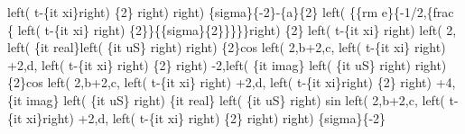 \begin{maplegroup}
left( t-\{it xi\}right) \{2\} right)  right) \{sigma\}\{-2\}-\{a\}\{2\} left( \{\{rm e\}\{-1/2,\{frac \{ left( t-\{it xi\} right) \{2\}\}\{\{sigma\}\{2\}\}\}\}\}right) \{2\} left( t-\{it xi\} right)  left( 2, left( \{it real\}left( \{it uS\} right)  right) \{2\}cos left( 2,b+2,c, left( t-\{it xi\} right) +2,d, left( t-\{it xi\} right) \{2\} right) -2,left( \{it imag\} left( \{it uS\} right)  right) \{2\}cos left( 2,b+2,c, left( t-\{it xi\} right) +2,d, left( t-\{it xi\}right) \{2\} right) +4,\{it imag\} left( \{it uS\} right) \{it real\} left( \{it uS\} right) sin left( 2,b+2,c, left( t-\{it xi\}right) +2,d, left( t-\{it xi\} right) \{2\} right)  right) \{sigma\}\{-2\}\end{maplegroup}
\begin{maplegroup}
\begin{mapleinput}
\end{mapleinput}
\end{maplegroup}
%

